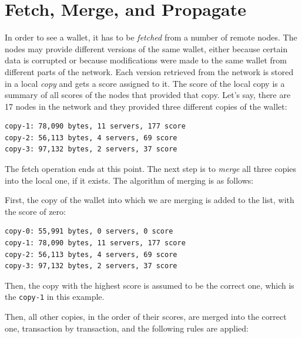 \documentclass[11pt,oneside]{article}
\newcommand\dd[1]{\colorbox{gray!30}{\texttt{#1}}}
\begin{document}
\section{Fetch, Merge, and Propagate}\label{sec:fetch}

In order to see a wallet, it has to be \emph{fetched} from a number of remote
nodes. The nodes may provide different versions of the same wallet, either
because certain data is corrupted or because modifications were made to the same
wallet from different parts of the network. Each version retrieved from the
network is stored in a local \emph{copy} and gets a score assigned to it.
The score of the local copy is a summary of all scores of the nodes that
provided that copy. Let's say, there are 17 nodes in the network and they
provided three different copies of the wallet:

\begin{verbatim}
copy-1: 78,090 bytes, 11 servers, 177 score
copy-2: 56,113 bytes, 4 servers, 69 score
copy-3: 97,132 bytes, 2 servers, 37 score
\end{verbatim}

The fetch operation ends at this point. The next step is to \emph{merge}
all three copies into the local one, if it exists. The algorithm of merging
is as follows:

First, the copy of the wallet into which we are merging is added to the list,
with the score of zero:

\begin{verbatim}
copy-0: 55,991 bytes, 0 servers, 0 score
copy-1: 78,090 bytes, 11 servers, 177 score
copy-2: 56,113 bytes, 4 servers, 69 score
copy-3: 97,132 bytes, 2 servers, 37 score
\end{verbatim}

Then, the copy with the highest score is assumed to be the correct one,
which is the \dd{copy-1} in this example.

Then, all other copies, in the order of their scores, are merged into the
correct one, transaction by transaction, and the following rules are applied:
\end{document}
